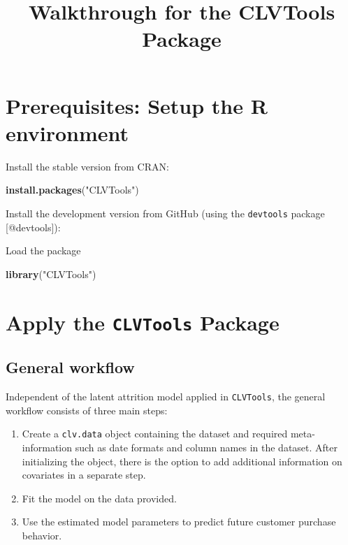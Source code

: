 \documentclass[
]{article}
\title{Walkthrough for the CLVTools Package}
\author{}
\date{\vspace{-2.5em}}
\newenvironment{Shaded}{\begin{snugshade}}{\end{snugshade}}
\newcommand{\FunctionTok}[1]{\textcolor[rgb]{0.13,0.29,0.53}{\textbf{#1}}}
\newcommand{\NormalTok}[1]{#1}
\newcommand{\StringTok}[1]{\textcolor[rgb]{0.31,0.60,0.02}{#1}}
\begin{document}
\maketitle

{
\setcounter{tocdepth}{2}
\tableofcontents
}
\section{Prerequisites: Setup the R
environment}\label{prerequisites-setup-the-r-environment}

Install the stable version from CRAN:

\begin{Shaded}
\begin{Highlighting}[]
\FunctionTok{install.packages}\NormalTok{(}\StringTok{"CLVTools"}\NormalTok{)}
\end{Highlighting}
\end{Shaded}

Install the development version from GitHub (using the \texttt{devtools}
package {[}@devtools{]}):

Load the package

\begin{Shaded}
\begin{Highlighting}[]
\FunctionTok{library}\NormalTok{(}\StringTok{"CLVTools"}\NormalTok{)}
\end{Highlighting}
\end{Shaded}

\section{\texorpdfstring{Apply the \texttt{CLVTools}
Package}{Apply the CLVTools Package}}\label{apply-the-clvtools-package}

\subsection{General workflow}\label{general-workflow}

Independent of the latent attrition model applied in \texttt{CLVTools},
the general workflow consists of three main steps:

\begin{enumerate}
\def\labelenumi{\arabic{enumi}.}
\item
  Create a \texttt{clv.data} object containing the dataset and required
  meta-information such as date formats and column names in the dataset.
  After initializing the object, there is the option to add additional
  information on covariates in a separate step.
\item
  Fit the model on the data provided.
\item
  Use the estimated model parameters to predict future customer purchase
  behavior.
\end{enumerate}
\end{document}
